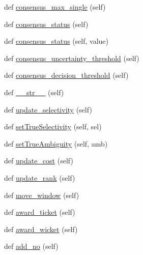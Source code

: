 \begin{DoxyCompactItemize}
def \mbox{\hyperlink{classdynamicfilterapp_1_1models_1_1_predicate_abcab4ef70d7f8b63e70922755fa2daf8}{consensus\+\_\+max\+\_\+single}} (self)
\item 
def \mbox{\hyperlink{classdynamicfilterapp_1_1models_1_1_predicate_aa052e06571748727ad162068d955009b}{consensus\+\_\+status}} (self)
\item 
def \mbox{\hyperlink{classdynamicfilterapp_1_1models_1_1_predicate_a17886248032e85320808da26e5254fff}{consensus\+\_\+status}} (self, value)
\item 
def \mbox{\hyperlink{classdynamicfilterapp_1_1models_1_1_predicate_abb47f59cdc395b26b76297491b95d603}{consensus\+\_\+uncertainty\+\_\+threshold}} (self)
\item 
def \mbox{\hyperlink{classdynamicfilterapp_1_1models_1_1_predicate_abeb36f0601037cc6f8066fdb9dea2cc3}{consensus\+\_\+decision\+\_\+threshold}} (self)
\item 
def \mbox{\hyperlink{classdynamicfilterapp_1_1models_1_1_predicate_a23e8041ce1015febe4fdace3225714f9}{\+\_\+\+\_\+str\+\_\+\+\_\+}} (self)
\item 
def \mbox{\hyperlink{classdynamicfilterapp_1_1models_1_1_predicate_a20d11566ab0f56ccf8baac7a18809185}{update\+\_\+selectivity}} (self)
\item 
def \mbox{\hyperlink{classdynamicfilterapp_1_1models_1_1_predicate_a846159dde6bc49c65012e40cf2643958}{set\+True\+Selectivity}} (self, sel)
\item 
def \mbox{\hyperlink{classdynamicfilterapp_1_1models_1_1_predicate_aec5ecc4928cd887effbee7c856705901}{set\+True\+Ambiguity}} (self, amb)
\item 
def \mbox{\hyperlink{classdynamicfilterapp_1_1models_1_1_predicate_a848ee4c7a2121d6e272137b6d3c8b843}{update\+\_\+cost}} (self)
\item 
def \mbox{\hyperlink{classdynamicfilterapp_1_1models_1_1_predicate_ab9e5706b198fa9e44ba1560ac6ed6687}{update\+\_\+rank}} (self)
\item 
def \mbox{\hyperlink{classdynamicfilterapp_1_1models_1_1_predicate_a8a786176b300908a48478d640cd17e87}{move\+\_\+window}} (self)
\item 
def \mbox{\hyperlink{classdynamicfilterapp_1_1models_1_1_predicate_a532e4b5776e0364bd6c0b79bc06dce03}{award\+\_\+ticket}} (self)
\item 
def \mbox{\hyperlink{classdynamicfilterapp_1_1models_1_1_predicate_aae60ca5acfd2133e3c3938aa8013bbb8}{award\+\_\+wicket}} (self)
\item 
def \mbox{\hyperlink{classdynamicfilterapp_1_1models_1_1_predicate_adae340e94226ce820610efca7daf16e3}{add\+\_\+no}} (self)

\end{DoxyCompactItemize}
